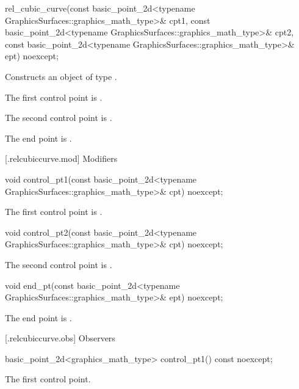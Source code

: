 %
\begin{itemdecl}
rel_cubic_curve(const basic_point_2d<typename GraphicsSurfaces::graphics_math_type>& cpt1,
  const basic_point_2d<typename GraphicsSurfaces::graphics_math_type>& cpt2,
  const basic_point_2d<typename GraphicsSurfaces::graphics_math_type>& ept) noexcept;
\end{itemdecl}
\begin{itemdescr}
\pnum
\effects Constructs an object of type .

\pnum
\remarks The first control point is .

\pnum
\remarks The second control point is .

\pnum
\remarks The end point is .
\end{itemdescr}

 [\iotwod.relcubiccurve.mod] {Modifiers}

%
\begin{itemdecl}
void control_pt1(const basic_point_2d<typename
  GraphicsSurfaces::graphics_math_type>& cpt) noexcept;
\end{itemdecl}
\begin{itemdescr}
\pnum
\effects
The first control point is .
\end{itemdescr}

%
\begin{itemdecl}
void control_pt2(const basic_point_2d<typename
  GraphicsSurfaces::graphics_math_type>& cpt) noexcept;
\end{itemdecl}
\begin{itemdescr}
\pnum
\effects
The second control point is .
\end{itemdescr}

%
\begin{itemdecl}
void end_pt(const basic_point_2d<typename GraphicsSurfaces::graphics_math_type>& ept) noexcept;
\end{itemdecl}
\begin{itemdescr}
\pnum
\effects
The end point is .
\end{itemdescr}

 [\iotwod.relcubiccurve.obs] {Observers}

%
\begin{itemdecl}
basic_point_2d<graphics_math_type> control_pt1() const noexcept;
\end{itemdecl}
\begin{itemdescr}
\pnum
\returns The first control point.
\end{itemdescr}

